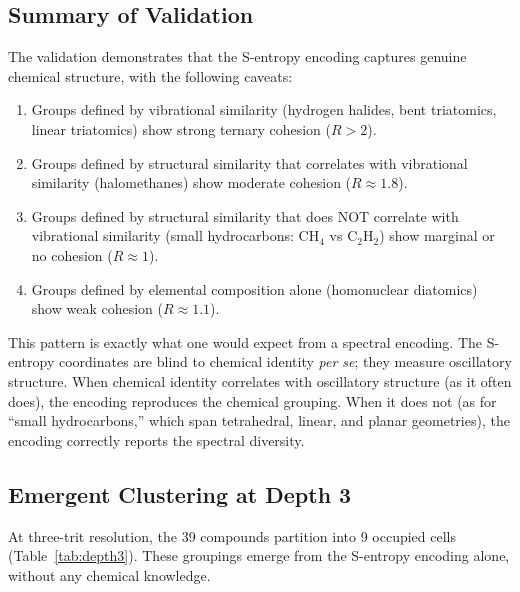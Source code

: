 \documentclass[11pt,a4paper]{article}
\theoremstyle{definition}
\theoremstyle{remark}
\begin{document}
\subsection{Summary of Validation}

The validation demonstrates that the S-entropy encoding captures genuine chemical structure, with the following caveats:

\begin{enumerate}[nosep]
\item Groups defined by vibrational similarity (hydrogen halides, bent triatomics, linear triatomics) show strong ternary cohesion ($R > 2$).
\item Groups defined by structural similarity that correlates with vibrational similarity (halomethanes) show moderate cohesion ($R \approx 1.8$).
\item Groups defined by structural similarity that does NOT correlate with vibrational similarity (small hydrocarbons: CH$_4$ vs C$_2$H$_2$) show marginal or no cohesion ($R \approx 1$).
\item Groups defined by elemental composition alone (homonuclear diatomics) show weak cohesion ($R \approx 1.1$).
\end{enumerate}

This pattern is exactly what one would expect from a spectral encoding. The S-entropy coordinates are blind to chemical identity \emph{per se}; they measure oscillatory structure. When chemical identity correlates with oscillatory structure (as it often does), the encoding reproduces the chemical grouping. When it does not (as for ``small hydrocarbons,'' which span tetrahedral, linear, and planar geometries), the encoding correctly reports the spectral diversity.

\subsection{Emergent Clustering at Depth 3}

At three-trit resolution, the 39 compounds partition into 9 occupied cells (Table~\ref{tab:depth3}). These groupings emerge from the S-entropy encoding alone, without any chemical knowledge.
\end{document}
